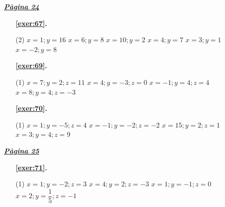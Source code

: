 \hyperlink{page.24}{\textbf{\em Pàgina 24}}
\begin{enumerate}



 \item[\fontfamily{phv}\selectfont\color{blue}\textbf{\ref{exer:67}. }] \label{ans:67}
 \begin{tasks}[column-sep=1em, item-indent=1.3333em](2)
	 \task  $x=1; y=16$
	 \task $x=6; y=8$
	 \task $x=10; y=2$
	 \task $x=4; y=7$
	 \task $x=3; y=1$
	 \task $x=-2; y=8$ 
\end{tasks}
 \end{enumerate}
\begin{enumerate}



 \item[\fontfamily{phv}\selectfont\color{blue}\textbf{\ref{exer:69}. }] \label{ans:69}
 \begin{tasks}[column-sep=1em, item-indent=1.3333em](1)
	 \task  $x=7; y=2; z=11$
	 \task $x=4; y=-3; z=0$
	 \task $x=-1; y=4; z=4$
	 \task $x=8; y=4; z=-3$ 
\end{tasks}



 \item[\fontfamily{phv}\selectfont\color{blue}\textbf{\ref{exer:70}. }] \label{ans:70}
 \begin{tasks}[column-sep=1em, item-indent=1.3333em](1)
	 \task  $x=1; y=-5; z=4$
	 \task $x=-1; y=-2; z=-2$
	 \task $x=15; y=2; z=1$
	 \task $x=3; y=4; z=9$ 
\end{tasks}
 \end{enumerate}
\vspace{0.3cm}


\hyperlink{page.25}{\textbf{\em Pàgina 25}}
\begin{enumerate}



 \item[\fontfamily{phv}\selectfont\color{blue}\textbf{\ref{exer:71}. }] \label{ans:71}
 \begin{tasks}[column-sep=1em, item-indent=1.3333em](1)
	 \task  $x=1; y=-2; z=3$
	 \task $x=4; y=2; z=-3$
	 \task $x=1; y=-1; z=0$
	 \task $x=2; y=\dfrac {1}{5}; z=-1$ 
\end{tasks}
 \end{enumerate}
\vspace{0.3cm}

